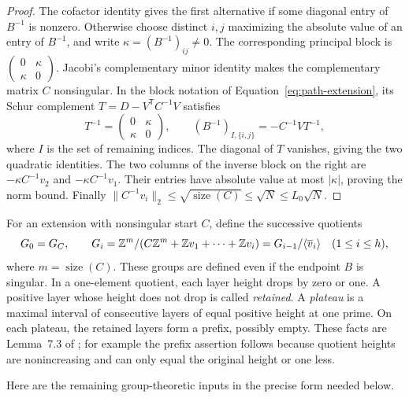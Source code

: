 \begin{proof}
The cofactor identity gives the first alternative if some diagonal entry
of \(B^{-1}\) is nonzero. Otherwise choose distinct \(i,j\) maximizing
the absolute value of an entry of \(B^{-1}\), and write
\(\kappa=(B^{-1})_{ij}\ne0\). The corresponding principal block is
\(\left(\begin{smallmatrix}0&\kappa\\\kappa&0\end{smallmatrix}\right)\).
Jacobi's complementary minor identity makes the complementary matrix
\(C\) nonsingular. In the block notation of
Equation~\eqref{eq:path-extension}, its Schur complement
\(T=D-V^{\mathsf T}C^{-1}V\) satisfies
\[
 T^{-1}=\begin{pmatrix}0&\kappa\\\kappa&0\end{pmatrix},
 \qquad (B^{-1})_{I,\{i,j\}}=-C^{-1}VT^{-1},
\]
where \(I\) is the set of remaining indices. The diagonal of \(T\)
vanishes, giving the two quadratic identities. The two columns of the
inverse block on the right are \(-\kappa C^{-1}v_2\) and
\(-\kappa C^{-1}v_1\). Their entries have absolute value at most
\(|\kappa|\), proving the norm bound. Finally
\(\lVert C^{-1}v_i\rVert_2\le\sqrt{\operatorname{size}(C)}
\le\sqrt N\le L_0\sqrt N\).
\end{proof}

For an extension with nonsingular start \(C\), define the successive
quotients
\begin{equation}\label{eq:path-quotients}
 G_0=G_C,\qquad
 G_i=\mathbb Z^m/(C\mathbb Z^m+\mathbb Z v_1+\cdots+\mathbb Z v_i)
       =G_{i-1}/\langle\overline v_i\rangle
       \quad(1\le i\le h),
\end{equation}
where \(m=\operatorname{size}(C)\). These groups are defined even if
the endpoint \(B\) is singular. In a one-element quotient, each layer
height drops by zero or one. A positive layer whose height does not
drop is called \emph{retained}. A \emph{plateau} is a maximal interval
of consecutive layers of equal positive height at one prime. On each
plateau, the retained layers form a prefix, possibly empty. These
facts are Lemma~7.3 of \cite{SymmetricRate}; for example the prefix
assertion follows because quotient heights are nonincreasing and can
only equal the original height or one less.

Here are the remaining group-theoretic inputs in the precise form
needed below.

